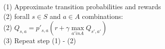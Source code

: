 \documentclass{article}
\begin{document}
\begin{flushleft}
(1) Approximate transition probabilities and rewards \\ 
 \vspace{0.25cm}
(2) forall $s \in S$ and $a \in A$ combinations: \\
 \vspace{0.25cm} 
(2) $Q_{s, a} = p'_{s, a} (r + \gamma \max\limits_{a' in A} Q_{s', a'})$\\ 
 \vspace{0.25cm} 
(3) Repeat step (1) - (2) \\ 
\end{flushleft}
\end{document}
